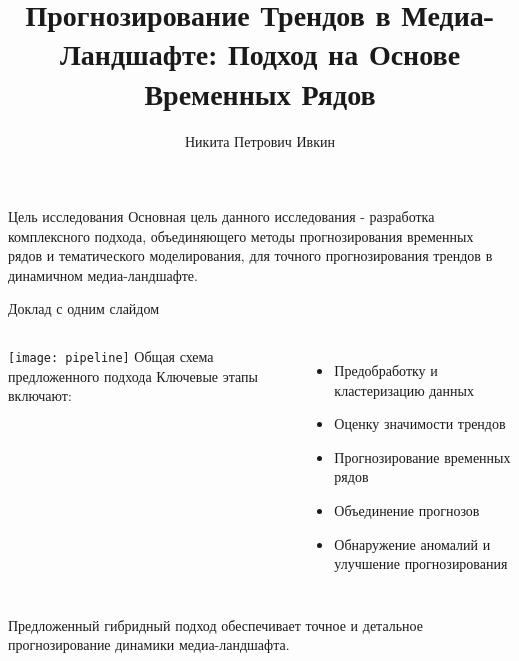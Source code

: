\documentclass{beamer}
\title[Прогнозирование Трендов в Медиа-Ландшафте]{Прогнозирование Трендов в Медиа-Ландшафте: Подход на Основе Временных Рядов}
\author[Н.\,П. Ивкин]{Никита Петрович Ивкин}
\institute{Московский физико-технический институт}
\date{\footnotesize
\par\smallskip\emph{Курс:} Автоматизация научных исследований\par (практика, В.\,В.~Стрижов)/Группа 874
\par\smallskip\emph{Эксперт:} О.\,Н.~Петров
\par\smallskip\emph{Консультант:} Ш.\,Л.~Фоменко
\par\bigskip\small 2021}
\begin{document}
\begin{frame}
\thispagestyle{empty}
\maketitle
\end{frame}
\begin{frame}{Цель исследования}
Основная цель данного исследования - разработка комплексного подхода, объединяющего методы прогнозирования временных рядов и тематического моделирования, для точного прогнозирования трендов в динамичном медиа-ландшафте.
\end{frame}
\begin{frame}{Доклад с одним слайдом}

\begin{columns}[c]
\texttt{[image: pipeline]}
    Общая схема предложенного подхода
    Ключевые этапы включают:
    \begin{itemize}
        \item Предобработку и кластеризацию данных
        \item Оценку значимости трендов
        \item Прогнозирование временных рядов
        \item Объединение прогнозов
        \item Обнаружение аномалий и улучшение прогнозирования
    \end{itemize}
\end{columns}

\bigskip
Предложенный гибридный подход обеспечивает точное и детальное прогнозирование динамики медиа-ландшафта.
\end{frame}
\end{document}
